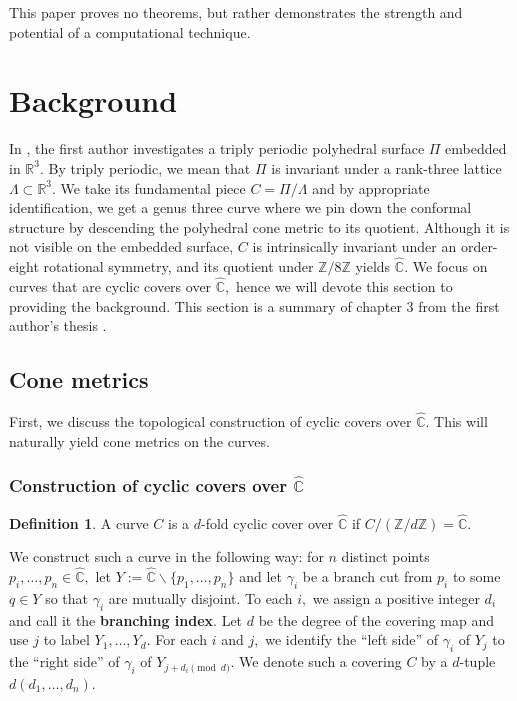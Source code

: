 \documentclass[12pt,reqno]{amsart}
\newcommand{\C}{\mathbb{C}}
\newcommand{\Z}{\mathbb{Z}}
\newcommand{\R}{\mathbb{R}}
\theoremstyle{definition}
\newtheorem{defn}{Definition}
\theoremstyle{remark}
\begin{document}
This paper proves no theorems, but rather demonstrates the strength and potential of a computational technique.

\section{Background}
\label{sec: dthesis}
In \cite{dami}, the first author investigates a triply periodic polyhedral surface $\Pi$ embedded in $\mathbb{R}^3.$ By triply periodic, we mean that $\Pi$ is invariant under a rank-three lattice $\Lambda \subset \R^3.$ We take its fundamental piece $C = \Pi / \Lambda$ and by appropriate identification, we get a genus three curve where we pin down the conformal structure by descending the polyhedral cone metric to its quotient. Although it is not visible on the embedded surface, $C$ is intrinsically invariant under an order-eight rotational symmetry, and its quotient under $\Z/ 8 \Z$ yields $\widehat{\C}.$ We focus on curves that are cyclic covers over $\widehat{\C},$ hence we will devote this section to providing the background. This section is a summary of chapter 3 from the first author's thesis \cite{dthesis}. 

\subsection{Cone metrics}
First, we discuss the topological construction of cyclic covers over $\widehat{\C}.$ This will naturally yield cone metrics on the curves.

\subsubsection*{Construction of cyclic covers over $\widehat{\C}$}
\begin{defn} A curve $C$ is a $d$-fold cyclic cover over $\widehat{\C}$ if $C / (\Z/ d \Z) = \widehat{\C}.$ \end{defn}

We construct such a curve in the following way: for $n$ distinct points $p_i, \ldots , p_n \in \widehat{\C},$ let $Y := \widehat{\C} \backslash \{p_1, \ldots, p_n\}$ and let $\gamma_i$ be a branch cut from $p_i$ to some $q \in Y$ so that $\gamma_i$ are mutually disjoint. To each $i,$ we assign a positive integer $d_i$ and call it the \textbf{branching index}. Let $d$ be the degree of the covering map and use $j$ to label $Y_1, \ldots , Y_d.$ For each $i$ and $j,$ we identify the ``left side'' of $\gamma_i$ of $Y_j$ to the ``right side'' of $\gamma_i$ of $Y_{j + d_i \pmod d}.$ We denote such a covering $C$ by a $d$-tuple $d (d_1, \ldots , d_n).$
\end{document}
